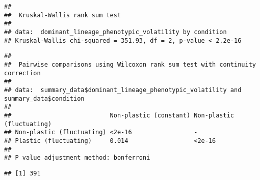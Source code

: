 \documentclass[]{book}
\newenvironment{Shaded}{\begin{snugshade}}{\end{snugshade}}
\newcommand{\DataTypeTok}[1]{\textcolor[rgb]{0.13,0.29,0.53}{#1}}
\newcommand{\KeywordTok}[1]{\textcolor[rgb]{0.13,0.29,0.53}{\textbf{#1}}}
\newcommand{\NormalTok}[1]{#1}
\newcommand{\OperatorTok}[1]{\textcolor[rgb]{0.81,0.36,0.00}{\textbf{#1}}}
\newcommand{\StringTok}[1]{\textcolor[rgb]{0.31,0.60,0.02}{#1}}
\begin{document}
\begin{verbatim}
## 
##  Kruskal-Wallis rank sum test
## 
## data:  dominant_lineage_phenotypic_volatility by condition
## Kruskal-Wallis chi-squared = 351.93, df = 2, p-value < 2.2e-16
\end{verbatim}

\begin{Shaded}
\end{Shaded}

\begin{verbatim}
## 
##  Pairwise comparisons using Wilcoxon rank sum test with continuity correction 
## 
## data:  summary_data$dominant_lineage_phenotypic_volatility and summary_data$condition 
## 
##                           Non-plastic (constant) Non-plastic (fluctuating)
## Non-plastic (fluctuating) <2e-16                 -                        
## Plastic (fluctuating)     0.014                  <2e-16                   
## 
## P value adjustment method: bonferroni
\end{verbatim}

\begin{Shaded}
\end{Shaded}

\begin{verbatim}
## [1] 391
\end{verbatim}

\begin{Shaded}
\end{Shaded}
\end{document}
